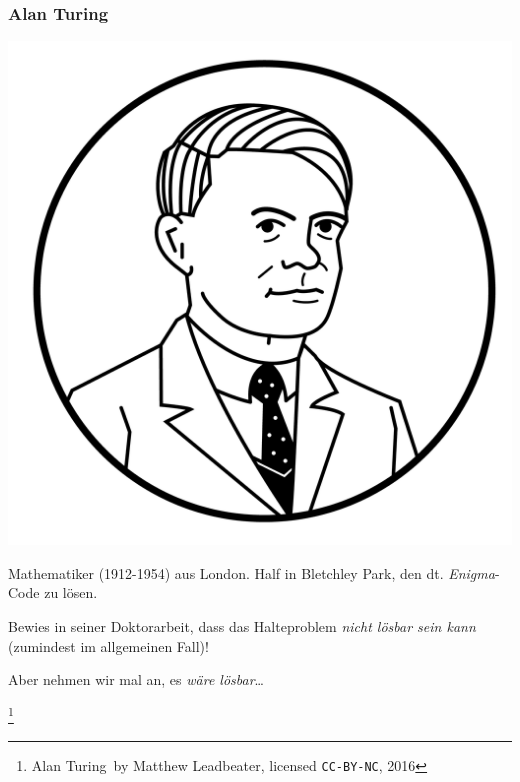 \documentclass[aspectratio=169]{beamer}
\newcommand\blfootnote[1]{%
  \begingroup
  \renewcommand\thefootnote{}\footnote{#1}%
  \addtocounter{footnote}{-1}%
  \endgroup
}
\begin{document}
\begin{frame}
\frametitle{Alan Turing}

\begin{multicols}{2}

\begin{center}
\includegraphics[scale=0.3]{images/turing-circle.png} 
\end{center}

\columnbreak

Mathematiker (1912-1954) aus London. Half in Bletchley Park, den dt. \emph{Enigma}-Code zu lösen.
\bigskip

Bewies in seiner Doktorarbeit, dass das Halteproblem \emph{nicht lösbar sein kann} (zumindest im allgemeinen Fall)!
\pause\bigskip

Aber nehmen wir mal an, es \emph{wäre lösbar}\dots

\end{multicols}

\blfootnote{\glqq Alan Turing\grqq\ by Matthew Leadbeater, licensed \texttt{CC-BY-NC}, 2016}
\end{frame}

\end{document}
